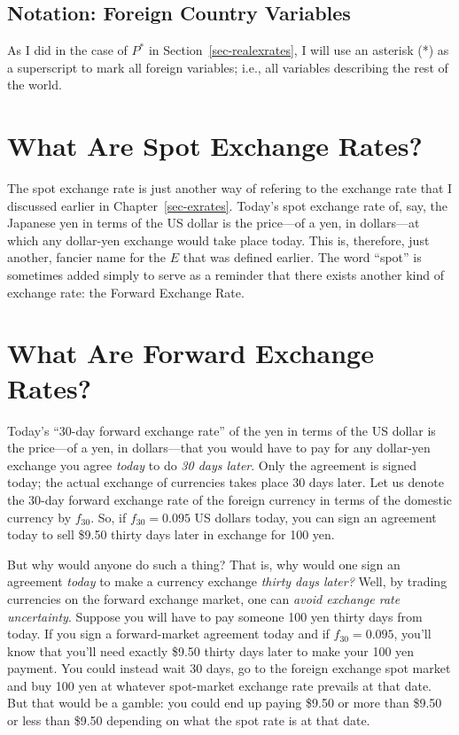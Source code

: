 \documentclass[
  letterpaper,
]{book}
\begin{document}
\subsection{Notation: Foreign Country Variables}\label{sec-notnfornvar}

As I did in the case of \(P^*\) in Section~\ref{sec-realexrates}, I will
use an asterisk (*) as a superscript to mark all foreign variables;
i.e., all variables describing the rest of the world.

\section{What Are Spot Exchange Rates?}\label{sec-spotexrates}

The spot exchange rate is just another way of refering to the exchange
rate that I discussed earlier in Chapter~\ref{sec-exrates}. Today's spot
exchange rate of, say, the
Japanese yen in terms of the US dollar is the price---of a yen, in
dollars---at which any dollar-yen exchange would take place today. This
is, therefore, just another, fancier name for the \(E\) that was defined
earlier. The word ``spot'' is sometimes added simply to serve as a
reminder that there exists another kind of exchange rate: the Forward
Exchange Rate.

\section{What Are Forward Exchange Rates?}\label{sec-forwardexrates}

Today's ``30-day forward exchange
rate'' of the yen in terms of
the US dollar is the price---of a yen, in dollars---that you would have
to pay for any dollar-yen exchange you agree \emph{today} to do \emph{30
days later}. Only the agreement is signed today; the actual exchange of
currencies takes place 30 days later. Let us denote the 30-day forward
exchange rate of the foreign currency in terms of the domestic currency
by \(f_{30}\). So, if \(f_{30} = 0.095\) US dollars today, you can sign
an agreement today to sell \$9.50 thirty days later in exchange for 100
yen.

But why would anyone do such a thing? That is, why would one sign an
agreement \emph{today} to make a currency exchange \emph{thirty days
later?} Well, by trading currencies on the forward exchange market, one
can \emph{avoid exchange rate uncertainty}. Suppose you will have to pay
someone 100 yen thirty days from today. If you sign a forward-market
agreement today and if \(f_{30}=0.095\), you'll know that you'll need
exactly \$9.50 thirty days later to make your 100 yen payment. You could
instead wait 30 days, go to the foreign exchange spot market and buy 100
yen at whatever spot-market exchange rate prevails at that date. But
that would be a gamble: you could end up paying \$9.50 or more than
\$9.50 or less than \$9.50 depending on what the spot rate is at that
date.
\end{document}
